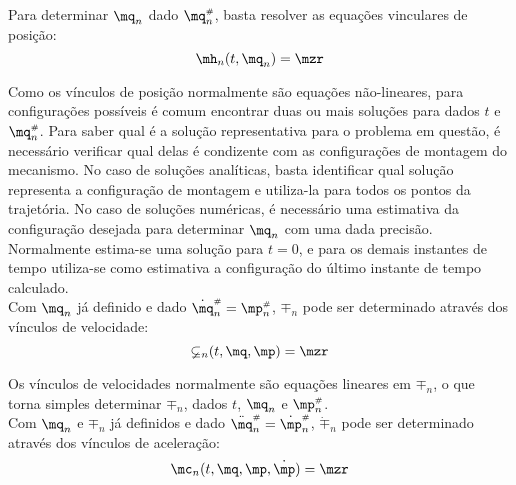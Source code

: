 Para determinar $\mq_n$ dado $\mq_n\ssh$, basta resolver as equa\c{c}\~oes vinculares de posi\c{c}\~ao: 
\begin{equation} \label{eq:PositionConstraints}
\mh_n(t, \mq_n) = \mzr
\end{equation}


Como os v\'inculos de posi\c{c}\~ao normalmente s\~ao equa\c{c}\~oes n\~ao-lineares, para configura\c{c}\~oes poss\'iveis \'e comum encontrar duas ou mais solu\c{c}\~oes para dados $t$ e $\mq_n\ssh$. Para saber qual \'e a solu\c{c}\~ao representativa para o problema em quest\~ao, \'e necess\'ario verificar qual delas \'e condizente com as configura\c{c}\~oes de montagem do mecanismo. No caso de solu\c{c}\~oes anal\'iticas, basta identificar qual solu\c{c}\~ao representa a configura\c{c}\~ao de montagem e utiliza-la para todos os pontos da trajet\'oria. No caso de solu\c{c}\~oes num\'ericas, \'e necess\'ario uma estimativa da configura\c{c}\~ao desejada para determinar $\mq_n$ com uma dada precis\~ao. Normalmente estima-se uma solu\c{c}\~ao para $t=0$, e para os demais instantes de tempo utiliza-se como estimativa a configura\c{c}\~ao do \'ultimo instante de tempo calculado. \\

Com $\mq_n$ j\'a definido e dado $\dot{\mq}_n\ssh = \mp_n\ssh$, $\mp_n$ pode ser determinado atrav\'es dos v\'inculos de velocidade:
\begin{equation} \label{eq:VelocityConstraints}
\mathbb{\psi}_n (t, \mq, \mp) = \mzr
\end{equation}


Os v\'inculos de velocidades normalmente s\~ao equa\c{c}\~oes lineares em $\mp_n$, o que torna simples determinar $\mp_n$, dados $t$, $\mq_n$ e $\mp_n\ssh$. \\

Com $\mq_n$ e $\mp_n$ j\'a definidos e dado $\ddot{\mq}_n\ssh = \dot{\mp}_n\ssh$, $\dot{\mp}_n$ pode ser determinado atrav\'es dos v\'inculos de acelera\c{c}\~ao:
\begin{equation} \label{eq:AccelerationConstraints}
\mc_n (t, \mq, \mp, \dot{\mp}) = \mzr
\end{equation}

